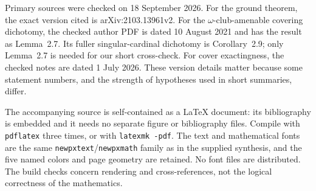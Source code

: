 \documentclass[11pt,letterpaper]{article}
\theoremstyle{definition}
\numberwithin{equation}{section}
\begin{document}
Primary sources were checked on 18 September 2026. For the ground
theorem, the exact version cited is arXiv:2103.13961v2. For the
$\omega$-club-amenable covering dichotomy, the checked author PDF is
dated 10 August 2021 and has the result as Lemma~2.7. Its fuller
singular-cardinal dichotomy is Corollary~2.9; only Lemma~2.7 is needed
for our short cross-check. For cover exactingness, the checked notes
are dated 1 July 2026. These version details matter because some
statement numbers, and the strength of hypotheses used in short
summaries, differ.

The accompanying source is self-contained as a \LaTeX{} document:
its bibliography is embedded and it needs no separate figure or
bibliography files. Compile with \texttt{pdflatex} three times, or
with \texttt{latexmk -pdf}. The text and mathematical fonts are the
same \texttt{newpxtext}/\texttt{newpxmath} family as in the supplied
synthesis, and the five named colors and page geometry are retained.
No font files are distributed. The build checks concern rendering
and cross-references, not the logical correctness of the mathematics.
\end{document}
